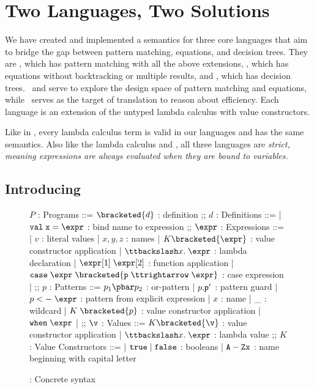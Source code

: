 \documentclass[article,screen,12pt, nonacm]{acmart}
\begin{document}
        


    \section{Two Languages, Two Solutions}
    We have created and implemented a semantics for three core languages that
    aim to bridge the gap between pattern matching, equations, and decision
    trees. They are \PPlus, which has pattern matching with all the above
    extensions, \VMinus, which has equations without backtracking or multiple
    results, and \D, which has decision trees. \PPlus\ and \VMinus serve to
    explore the design space of pattern matching and equations, while \D\ serves
    as the target of translation to reason about efficiency. Each language is an
    extension of the untyped lambda calculus with value constructors. 
    
    Like in \VC, every lambda calculus term is valid in our languages and has
    the same semantics. Also like the lambda calculus and \VC, all three
    languages are \it{strict}, meaning expressions are always evaluated when
    they are bound to variables. 
    

\subsection{Introducing \PPlus}
\label{pplus}

\begin{figure}
\begin{center}
\begin{bnf}
$P$ : \textsf{Programs} ::=
$\bracketed{d}$ : definition
;;
$d$ : \textsf{Definitions} ::=
| $\tt{val}\; x\; \tt{=}\; \expr$ : bind name to expression
;;
$\expr$ : Expressions ::= 
| $v$ : literal values 
| $x, y, z$ : names
| $K\bracketed{\expr}$ : value constructor application 
| $\ttbackslash x.\; \expr$ : lambda declaration  
| $\expr[1]\; \expr[2]$ : function application 
| $\tt{case}\; \expr\; \bracketed{p\; \ttrightarrow\; \expr}$ : case expression 
| \ttbraced{$\expr$}
;;
$p$ : \textsf{Patterns} ::= $p_{1}\pbar p_{2}$ : or-pattern
| $p \tt{,} p'$ : pattern guard 
| $p\; \tt{<-}\; \expr$ : pattern from explicit expression  
| $x$ : name 
| $\tt{\_}$ : wildcard 
| $K\; \bracketed{p}$ : value constructor application 
| $\tt{when}\; \expr$
| 
;;
$\v$ : Values ::= $K\bracketed{\v}$ : value constructor application 
| $\ttbackslash x.\; \expr$ : lambda value 
;;
$K$ : \textsf{Value Constructors} ::=
| $\tt{true}\; \vert\; \tt{false}$ : booleans
| $\tt{A-Z}x$ : name beginning with capital letter
\end{bnf}
\end{center}
\caption{\PPlus: Concrete syntax}
\label{fig:ppsyntax}
\end{figure}
\end{document}
